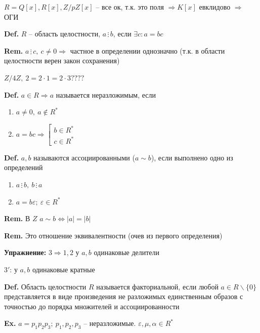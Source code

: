 \documentclass[14pt, letter paper]{article}
\begin{document}
$R = Q[x], R[x], Z/pZ[x]$ -- все ок, т.к. это поля $\Rightarrow K[x]$ евклидово $\Rightarrow$ ОГИ

\vspace{5mm}

\textbf{Def.} $R$ -- область целостности, $a \, \vdots \, b$, если $\exists c : a = bc$

\textbf{Rem.} $a \, \vdots \, c,\ c \neq 0 \Rightarrow$ частное в определении однозначно (т.к. в области целостности верен закон сохранения)

$Z/4Z,\ 2 = 2 \cdot 1 = 2 \cdot 3 ????$

\textbf{Def.} $a \in R \Rightarrow a$ называется неразложимым, если 

\begin{enumerate}
    \item $a \neq 0,\ a \not \in R^*$
    \item $a = bc \Rightarrow \left[ \begin{gathered}
        b \in R^* \\
        c \in R^*
    \end{gathered} \right.$
\end{enumerate}

\textbf{Def.} $a, b$ называются ассоциированными ($a \sim b$), если выполнено одно из определений

\begin{enumerate}
    \item $a \, \vdots \, b,\ b \, \vdots \, a$
    \item $a = b\varepsilon;\ \varepsilon \in R^*$
\end{enumerate}

\textbf{Rem.} В $Z$ $a \sim b \Leftrightarrow |a| = |b|$

\textbf{Rem.} Это отношение эквивалентности (очев из первого определения)

\textbf{Упражнение:} $3 \Rightarrow 1, 2$ у $a, b$ одинаковые делители

$3'$: у $a, b$ одинаковые кратные

\vspace{5mm}

\textbf{Def.} Область целостности $R$ называется факториальной, если любой $a \in R\backslash\{0\}$ представляется в виде произведения не разложимых единственным образов с точностью до порядка множителей и ассоциированности

\textbf{Ex.} $a = p_1p_2p_3;\ p_1,p_2,p_3$ -- неразложимые. $\varepsilon, \mu, \alpha \in R^*$
\end{document}
